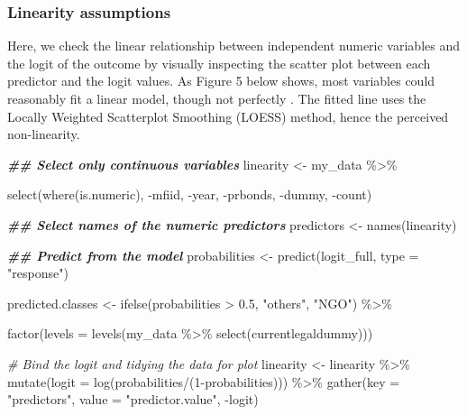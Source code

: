 \documentclass[a4paper,nobind]{templates/ociamthesis}
\newenvironment{Shaded}{\begin{snugshade}}{\end{snugshade}}
\newcommand{\AttributeTok}[1]{\textcolor[rgb]{0.77,0.63,0.00}{#1}}
\newcommand{\CommentTok}[1]{\textcolor[rgb]{0.56,0.35,0.01}{\textit{#1}}}
\newcommand{\DecValTok}[1]{\textcolor[rgb]{0.00,0.00,0.81}{#1}}
\newcommand{\DocumentationTok}[1]{\textcolor[rgb]{0.56,0.35,0.01}{\textbf{\textit{#1}}}}
\newcommand{\FloatTok}[1]{\textcolor[rgb]{0.00,0.00,0.81}{#1}}
\newcommand{\FunctionTok}[1]{\textcolor[rgb]{0.00,0.00,0.00}{#1}}
\newcommand{\NormalTok}[1]{#1}
\newcommand{\OtherTok}[1]{\textcolor[rgb]{0.56,0.35,0.01}{#1}}
\newcommand{\SpecialCharTok}[1]{\textcolor[rgb]{0.00,0.00,0.00}{#1}}
\newcommand{\StringTok}[1]{\textcolor[rgb]{0.31,0.60,0.02}{#1}}
\renewenvironment{Shaded}
{
  \vspace{10pt}%
  \begin{snugshade}%
}{%
  \end{snugshade}%
  \vspace{8pt}%
}
\begin{document}
\hypertarget{linearity-assumptions}{%
\subsubsection{Linearity assumptions}\label{linearity-assumptions}}

Here, we check the linear relationship between independent numeric variables and the logit of the outcome by visually inspecting the scatter plot between each predictor and the logit values. As Figure 5 below shows, most variables could reasonably fit a linear model, though not perfectly \autocite{cheng2007testing}. The fitted line uses the Locally Weighted Scatterplot Smoothing (LOESS) method, hence the perceived non-linearity.

\begin{landscape}

\begin{Shaded}
\begin{Highlighting}[]
\DocumentationTok{\#\# Select only continuous variables}
\NormalTok{linearity }\OtherTok{\textless{}{-}}\NormalTok{ my\_data }\SpecialCharTok{\%\textgreater{}\%} 
  
  \FunctionTok{select}\NormalTok{(}\FunctionTok{where}\NormalTok{(is.numeric), }\SpecialCharTok{{-}}\NormalTok{mfiid, }\SpecialCharTok{{-}}\NormalTok{year, }\SpecialCharTok{{-}}\NormalTok{prbonds, }\SpecialCharTok{{-}}\NormalTok{dummy, }\SpecialCharTok{{-}}\NormalTok{count)}

\DocumentationTok{\#\# Select names of the numeric predictors}
\NormalTok{predictors }\OtherTok{\textless{}{-}} \FunctionTok{names}\NormalTok{(linearity)}

\DocumentationTok{\#\# Predict from the model}
\NormalTok{probabilities }\OtherTok{\textless{}{-}} \FunctionTok{predict}\NormalTok{(logit\_full, }\AttributeTok{type =} \StringTok{"response"}\NormalTok{)}

\NormalTok{predicted.classes }\OtherTok{\textless{}{-}} \FunctionTok{ifelse}\NormalTok{(probabilities }\SpecialCharTok{\textgreater{}} \FloatTok{0.5}\NormalTok{, }\StringTok{"others"}\NormalTok{, }\StringTok{"NGO"}\NormalTok{) }\SpecialCharTok{\%\textgreater{}\%} 
  
  \FunctionTok{factor}\NormalTok{(}\AttributeTok{levels =} \FunctionTok{levels}\NormalTok{(my\_data }\SpecialCharTok{\%\textgreater{}\%} \FunctionTok{select}\NormalTok{(currentlegaldummy)))}

\CommentTok{\# Bind the logit and tidying the data for plot}
\NormalTok{linearity }\OtherTok{\textless{}{-}}\NormalTok{ linearity }\SpecialCharTok{\%\textgreater{}\%}
  \FunctionTok{mutate}\NormalTok{(}\AttributeTok{logit =} \FunctionTok{log}\NormalTok{(probabilities}\SpecialCharTok{/}\NormalTok{(}\DecValTok{1}\SpecialCharTok{{-}}\NormalTok{probabilities))) }\SpecialCharTok{\%\textgreater{}\%}
  \FunctionTok{gather}\NormalTok{(}\AttributeTok{key =} \StringTok{"predictors"}\NormalTok{, }\AttributeTok{value =} \StringTok{"predictor.value"}\NormalTok{, }\SpecialCharTok{{-}}\NormalTok{logit)}


\end{Highlighting}
\end{Shaded}
\end{landscape}
\end{document}
